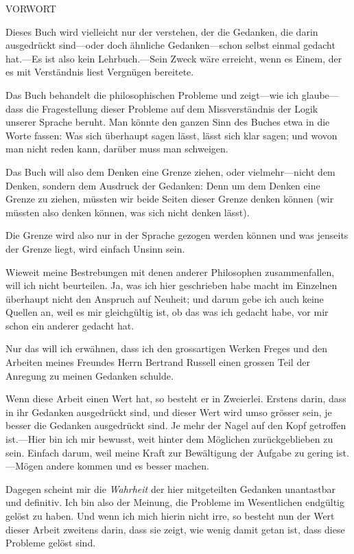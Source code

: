 \documentclass[12pt,oneside]{book}[2007/10/19]
\newcommand{\SkipToNewPage}[1]{\newpage\pagestyle{empty}
  \cleardoublepage\pagestyle{#1}
}
\newcommand{\Title}[1]{\vspace*{4.5ex}{\LARGE\bfseries #1}\vspace{9ex}}
\newcommand{\Preface}[2]{%
  \SkipToNewPage{plain}
  \phantomsection
  \pdfbookmark[0]{#2}{#2}
  \begin{center}
  \Title{#1}

  {\large \MakeUppercase{#2}}
  \end{center}
}
\newcommand{\Emph}[1]{\emph{#1}}%
\begin{document}
\Preface{Logisch-Philosophische Abhandlung}{Vorwort}


Dieses Buch wird vielleicht nur der verstehen, der
die Gedanken, die darin ausgedrückt sind---oder doch
ähnliche Gedanken---schon selbst einmal gedacht hat.---Es
ist also kein Lehrbuch.---Sein Zweck wäre erreicht,
wenn es Einem, der es mit Verständnis liest Vergnügen
bereitete.

Das Buch behandelt die philosophischen Probleme und
zeigt---wie ich glau\-be---dass die Fragestellung dieser Probleme
auf dem Missverständnis der Logik unserer Sprache
beruht. Man könnte den ganzen Sinn des Buches etwa in
die Worte fassen: Was sich überhaupt sagen lässt, lässt
sich klar sagen; und wovon man nicht reden kann, darüber
muss man schweigen.

Das Buch will also dem Denken eine Grenze ziehen, oder
viel\-mehr---nicht dem Denken, sondern dem Ausdruck der
Gedanken: Denn um dem Denken eine Grenze zu ziehen,
müssten wir beide Seiten dieser Grenze denken können (wir
müssten also denken können, was sich nicht denken
lässt).

Die Grenze wird also nur in der Sprache gezogen werden
können und was jenseits der Grenze liegt, wird einfach
Unsinn sein.

Wieweit meine Bestrebungen mit denen anderer Philosophen
zusammenfallen, will ich nicht beurteilen. Ja, was
ich hier geschrieben habe macht im Einzelnen überhaupt
nicht den Anspruch auf Neuheit; und darum gebe ich auch
keine Quellen an, weil es mir gleichgültig ist, ob das was
ich gedacht habe, vor mir schon ein anderer gedacht hat.

Nur das will ich erwähnen, dass ich den grossartigen
Werken Freges und den Arbeiten meines Freundes Herrn
Bertrand Russell einen grossen Teil der Anregung zu
meinen Gedanken schulde.

Wenn diese Arbeit einen Wert hat, so besteht er in
Zweierlei. Erstens darin, dass in ihr Gedanken ausgedrückt
sind, und dieser Wert wird umso grösser sein, je
besser die Gedanken ausgedrückt sind. Je mehr der
Nagel auf den Kopf getroffen ist.---Hier bin ich mir
bewusst, weit hinter dem Möglichen zurückgeblieben zu
sein. Einfach darum, weil meine Kraft zur Bewältigung
der Aufgabe zu gering ist.---Mögen andere kommen und
es besser machen.

Dagegen scheint mir die \Emph{Wahrheit} der hier mitgeteilten
Gedanken unantastbar und definitiv. Ich bin
also der Meinung, die Probleme im Wesentlichen
endgültig gelöst zu haben. Und wenn ich mich hierin
nicht irre, so besteht nun der Wert dieser Arbeit zweitens
darin, dass sie zeigt, wie wenig damit getan ist, dass
diese Probleme gelöst sind.
\end{document}
